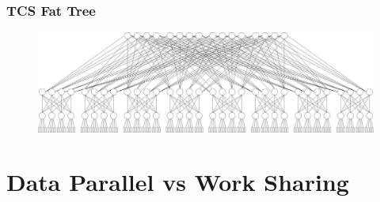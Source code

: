 \documentclass[12pt, a4paper]{book}
\begin{document}
\subsubsection{TCS Fat Tree}
\begin{figure}[h!]
    \centering
    \includegraphics[width=0.7\linewidth]{figures/TCS Fat Tree.png}
\end{figure}

\section{Data Parallel vs Work Sharing}
\end{document}
